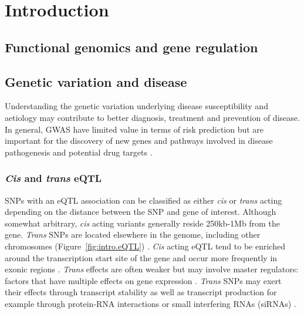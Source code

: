 \chapter{Introduction}
\label{ch:Intro}


\section{Functional genomics and gene regulation}
%
\section{Genetic variation and disease}
Understanding the genetic variation underlying disease susceptibility and aetiology may contribute to better diagnosis, treatment and prevention of disease. In general, GWAS have limited value in terms of risk prediction but are important for the discovery of new genes and pathways involved in disease pathogenesis and potential drug targets \parencite{Kooperberg2010}.

\subsection*{\textit{Cis} and \textit{trans} eQTL}
SNPs with an eQTL association can be classified as either \textit{cis} or \textit{trans} acting depending on the distance between the SNP and gene of interest. Although somewhat arbitrary, \textit{cis} acting variants generally reside 250kb-1Mb from the gene. \textit{Trans} SNPs are located elsewhere in the genome, including other chromosomes (Figure~\ref{fig:intro.eQTL}) \parencite{Williams2010}.  \textit{Cis} acting eQTL tend to be enriched around the transcription start site of the gene and occur more frequently in exonic regions \parencite{Veyrieras2008, Nica2011}. \textit{Trans} effects are often weaker but may involve master regulators: factors that have multiple effects on gene expression \parencite{Morley2004}. \textit{Trans} SNPs may exert their effects through transcript stability as well as transcript production for example through protein-RNA interactions or small interfering RNAs (siRNAs) \parencite{Grosshans2008}.

